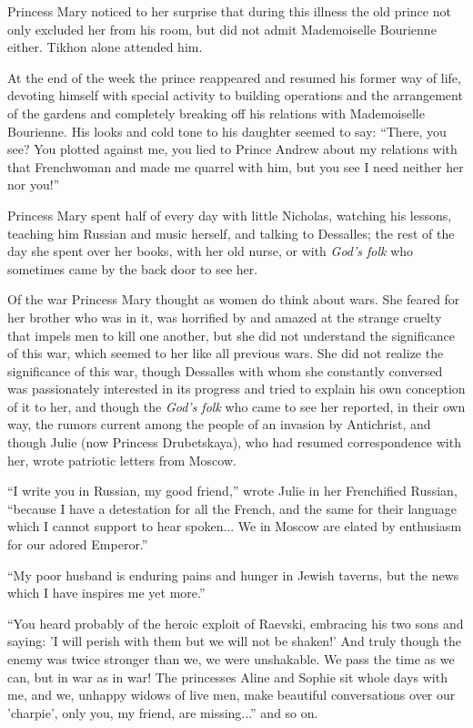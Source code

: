 Princess Mary noticed to her surprise that during this illness
the old prince not only excluded her from his room, but did not
admit Mademoiselle Bourienne either. Tikhon alone attended him.

At the end of the week the prince reappeared and resumed his
former way of life, devoting himself with special activity to
building operations and the arrangement of the gardens and
completely breaking off his relations with Mademoiselle
Bourienne. His looks and cold tone to his daughter seemed to say:
``There, you see? You plotted against me, you lied to Prince
Andrew about my relations with that Frenchwoman and made me
quarrel with him, but you see I need neither her nor you!''

Princess Mary spent half of every day with little Nicholas,
watching his lessons, teaching him Russian and music herself, and
talking to Dessalles; the rest of the day she spent over her
books, with her old nurse, or with \emph{God's folk} who
sometimes came by the back door to see her.

Of the war Princess Mary thought as women do think about
wars. She feared for her brother who was in it, was horrified by
and amazed at the strange cruelty that impels men to kill one
another, but she did not understand the significance of this war,
which seemed to her like all previous wars. She did not realize
the significance of this war, though Dessalles with whom she
constantly conversed was passionately interested in its progress
and tried to explain his own conception of it to her, and though
the \emph{God's folk} who came to see her reported, in their own
way, the rumors current among the people of an invasion by
Antichrist, and though Julie (now Princess Drubetskaya), who had
resumed correspondence with her, wrote patriotic letters from
Moscow.

``I write you in Russian, my good friend,'' wrote Julie in her
Frenchified Russian, ``because I have a detestation for all the
French, and the same for their language which I cannot support to
hear spoken... We in Moscow are elated by enthusiasm for our
adored Emperor.''

``My poor husband is enduring pains and hunger in Jewish taverns,
but the news which I have inspires me yet more.''

``You heard probably of the heroic exploit of Raevski, embracing
his two sons and saying: 'I will perish with them but we will not
be shaken!'  And truly though the enemy was twice stronger than
we, we were unshakable. We pass the time as we can, but in war as
in war! The princesses Aline and Sophie sit whole days with me,
and we, unhappy widows of live men, make beautiful conversations
over our 'charpie', only you, my friend, are missing...'' and so
on.

